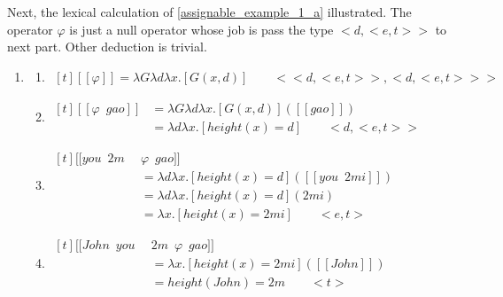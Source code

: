 \documentclass{ctexart}
\begin{document}
Next, the lexical calculation of \ref{assignable_example_1_a} illustrated. The operator $\varphi$ is just a null operator whose job is pass the type $<d,<e,t>>$ to next part. Other deduction is trivial.

\begin{enumerate}
    \item \label{assignable_example_lambda}
    \begin{enumerate}
        \item \label{assignable_example_lambda_a}
        $\begin{aligned}[t]
            [\![\varphi]\!] = \lambda G \lambda d \lambda x.[G(x,d)] \qquad <<d,<e,t>>,<d,<e,t>>>
        \end{aligned}$

        \item \label{assignable_example_lambda_b}
        $\begin{aligned}[t]
            [\![\varphi \enspace gao]\!] 
            &= \lambda G \lambda d \lambda x.[G(x,d)]([\![gao]\!]) \\
            &= \lambda d \lambda x.[height(x) = d] \qquad <d,<e,t>>
        \end{aligned}$

        \item \label{assignable_example_lambda_c}
        $\begin{aligned}[t]
            [\![you \enspace 2m \enspace &\varphi \enspace gao]\!] \\
            &= \lambda d \lambda x.[height(x) = d]([\![you \enspace 2mi]\!]) \\
            &= \lambda d \lambda x.[height(x) = d](2mi) \\
            &= \lambda x.[height(x) = 2mi] \qquad <e,t>
        \end{aligned}$

        \item \label{assignable_example_lambda_d}
        $\begin{aligned}[t]
            [\![John \enspace you \enspace &2m \enspace \varphi \enspace gao]\!] \\
            &= \lambda x.[height(x) = 2mi]([\![John]\!]) \\
            &= height(John)=2m \qquad <t>
        \end{aligned}$
        
    \end{enumerate}
\end{enumerate}
\end{document}
